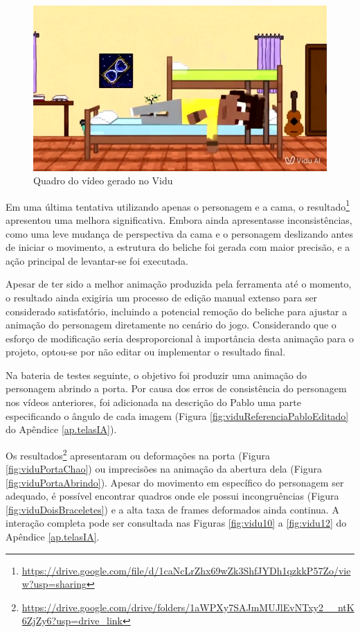 \begin{figure}[htbp]
    \centering
    \caption{\small Quadro do vídeo gerado no Vidu}
    \label{fig:viduVideoQuarto}
    \includegraphics[width=0.7\linewidth]{figs/vidu/frame8.jpg}
\end{figure}


Em uma última tentativa utilizando apenas o personagem e a cama, o resultado\footnote{\url{https://drive.google.com/file/d/1caNcLrZhx69wZk3ShfJYDh1qzkkP57Zo/view?usp=sharing}} apresentou uma melhora significativa. Embora ainda apresentasse inconsistências, como uma leve mudança de perspectiva da cama e o personagem deslizando antes de iniciar o movimento, a estrutura do beliche foi gerada com maior precisão, e a ação principal de levantar-se foi executada.

Apesar de ter sido a melhor animação produzida pela ferramenta até o momento, o resultado ainda exigiria um processo de edição manual extenso para ser considerado satisfatório, incluindo a potencial remoção do beliche para ajustar a animação do personagem diretamente no cenário do jogo. Considerando que o esforço de modificação seria desproporcional à importância desta animação para o projeto, optou-se por não editar ou implementar o resultado final.

Na bateria de testes seguinte, o objetivo foi produzir uma animação do personagem abrindo a porta. Por causa dos erros de consistência do personagem nos vídeos anteriores, foi adicionada na descrição do Pablo uma parte especificando o ângulo de cada imagem (Figura \ref{fig:viduReferenciaPabloEditado} do Apêndice \ref{ap.telasIA}). 

Os resultados\footnote{\url{https://drive.google.com/drive/folders/1aWPXy7SAJmMUJlEvNTxy2__ntK6ZjZy6?usp=drive_link}} apresentaram ou deformações na porta (Figura \ref{fig:viduPortaChao}) ou imprecisões na animação da abertura dela (Figura \ref{fig:viduPortaAbrindo}). Apesar do movimento em específico do personagem ser adequado, é possível encontrar quadros onde ele possui incongruências (Figura \ref{fig:viduDoisBraceletes}) e a alta taxa de frames deformados ainda continua. A interação completa pode ser consultada nas Figuras \ref{fig:vidu10} a \ref{fig:vidu12} do Apêndice \ref{ap.telasIA}.

